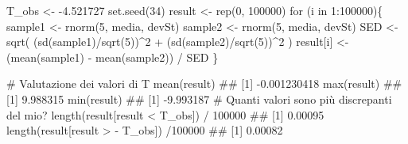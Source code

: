 \documentclass[a4paper,12pt,oneside]{book}
\newenvironment{Shaded}{\begin{snugshade}}{\end{snugshade}}
\newcommand{\DecValTok}[1]{#1}
\newcommand{\FloatTok}[1]{#1}
\newcommand{\SpecialCharTok}[1]{#1}
\newcommand{\CommentTok}[1]{#1}
\newcommand{\DocumentationTok}[1]{#1}
\newcommand{\OtherTok}[1]{#1}
\newcommand{\FunctionTok}[1]{#1}
\newcommand{\ControlFlowTok}[1]{#1}
\newcommand{\NormalTok}[1]{#1}
\begin{document}
\begin{Shaded}
\begin{Highlighting}[]
\NormalTok{T\_obs }\OtherTok{\textless{}{-}} \SpecialCharTok{{-}}\FloatTok{4.521727}
\FunctionTok{set.seed}\NormalTok{(}\DecValTok{34}\NormalTok{)}
\NormalTok{result }\OtherTok{\textless{}{-}} \FunctionTok{rep}\NormalTok{(}\DecValTok{0}\NormalTok{, }\DecValTok{100000}\NormalTok{)}
\ControlFlowTok{for}\NormalTok{ (i }\ControlFlowTok{in} \DecValTok{1}\SpecialCharTok{:}\DecValTok{100000}\NormalTok{)\{}
\NormalTok{  sample1 }\OtherTok{\textless{}{-}} \FunctionTok{rnorm}\NormalTok{(}\DecValTok{5}\NormalTok{, media, devSt)}
\NormalTok{  sample2 }\OtherTok{\textless{}{-}} \FunctionTok{rnorm}\NormalTok{(}\DecValTok{5}\NormalTok{, media, devSt)}
\NormalTok{  SED }\OtherTok{\textless{}{-}} \FunctionTok{sqrt}\NormalTok{( (}\FunctionTok{sd}\NormalTok{(sample1)}\SpecialCharTok{/}\FunctionTok{sqrt}\NormalTok{(}\DecValTok{5}\NormalTok{))}\SpecialCharTok{\^{}}\DecValTok{2} \SpecialCharTok{+}
\NormalTok{                 (}\FunctionTok{sd}\NormalTok{(sample2)}\SpecialCharTok{/}\FunctionTok{sqrt}\NormalTok{(}\DecValTok{5}\NormalTok{))}\SpecialCharTok{\^{}}\DecValTok{2}\NormalTok{ )}
\NormalTok{  result[i] }\OtherTok{\textless{}{-}}\NormalTok{ (}\FunctionTok{mean}\NormalTok{(sample1) }\SpecialCharTok{{-}} \FunctionTok{mean}\NormalTok{(sample2)) }\SpecialCharTok{/}\NormalTok{ SED}
\NormalTok{\}}

\CommentTok{\# Valutazione dei valori di T}
\FunctionTok{mean}\NormalTok{(result)}
\DocumentationTok{\#\# [1] {-}0.001230418}
\FunctionTok{max}\NormalTok{(result)}
\DocumentationTok{\#\# [1] 9.988315}
\FunctionTok{min}\NormalTok{(result)}
\DocumentationTok{\#\# [1] {-}9.993187}
\CommentTok{\# Quanti valori sono più discrepanti del mio?}
\FunctionTok{length}\NormalTok{(result[result }\SpecialCharTok{\textless{}}\NormalTok{ T\_obs]) }\SpecialCharTok{/} \DecValTok{100000}
\DocumentationTok{\#\# [1] 0.00095}
\FunctionTok{length}\NormalTok{(result[result }\SpecialCharTok{\textgreater{}} \SpecialCharTok{{-}}\NormalTok{ T\_obs]) }\SpecialCharTok{/}\DecValTok{100000}
\DocumentationTok{\#\# [1] 0.00082}
\end{Highlighting}
\end{Shaded}
\end{document}
